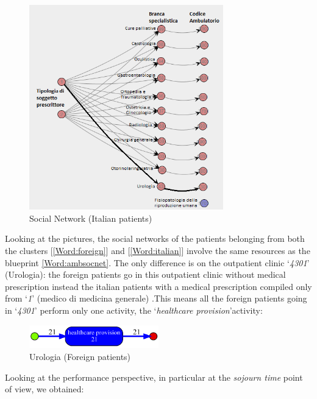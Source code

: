 \begin{figure}
\includegraphics[width=0.75\textwidth, keepaspectratio]{AmbulatoriSocialNetworkItalians}
\caption{Social Network (Italian patients)}
\end{figure}
\noindent
Looking at the pictures, the social networks of the patients belonging from both the clusters [\ref{Word:foreign}] and [\ref{Word:italian}] involve the same resources as the blueprint \ref{Word:ambsocnet}. The only difference is on the outpatient clinic `\textit{4301}' (Urologia): the foreign patients go in this outpatient clinic without medical prescription instead the italian patients with a medical prescription compiled only from `\textit{1}' (medico di medicina generale) .This means all the foreign patients going in `\textit{4301}' perform only one activity, the `\textit{healthcare provision}'activity:
\begin{figure} [htbp]
\includegraphics[width=0.5\textwidth, keepaspectratio]{AmbulatoriInductiveVisualMinerForeigns4301}
\caption{Urologia (Foreign patients)}
\end{figure}
\clearpage
\noindent
Looking at the performance perspective, in particular at the \textit{sojourn time} point of view, we obtained:
